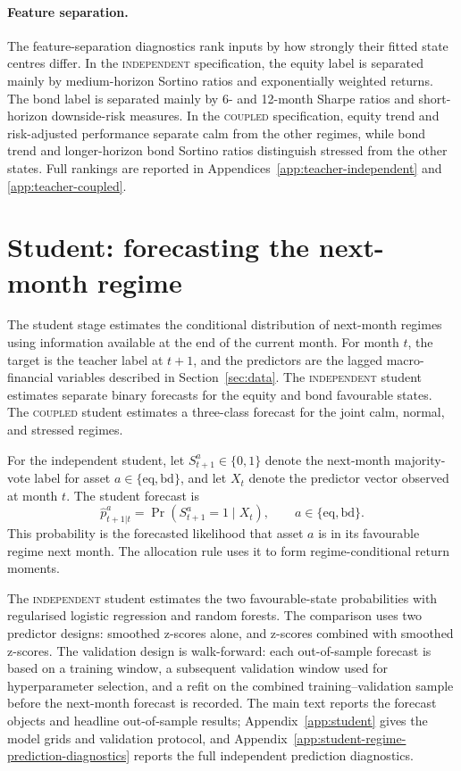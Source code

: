 \documentclass[10pt]{article}
\newcommand{\Acoup}{\textsc{coupled}}
\newcommand{\Bindep}{\textsc{independent}}
\begin{document}
\paragraph{Feature separation.}
The feature-separation diagnostics rank inputs by how strongly their fitted state centres
differ. In the \Bindep{} specification, the equity label is separated mainly by
medium-horizon Sortino ratios and exponentially weighted returns. The bond label is separated
mainly by 6- and 12-month Sharpe ratios and short-horizon downside-risk measures. In the
\Acoup{} specification, equity trend and risk-adjusted performance separate calm from the
other regimes, while bond trend and longer-horizon bond Sortino ratios distinguish stressed
from the other states. Full rankings are reported in Appendices~\ref{app:teacher-independent}
and \ref{app:teacher-coupled}.


\section{Student: forecasting the next-month regime}
\label{sec:student}

The student stage estimates the conditional distribution of next-month regimes using information available at the end of the current month. For month \(t\), the target is the teacher label at \(t+1\), and the predictors are the lagged macro-financial variables described in Section~\ref{sec:data}. The \Bindep{} student estimates separate binary forecasts for the equity and bond favourable states. The \Acoup{} student estimates a three-class forecast for the joint calm, normal, and stressed regimes.

For the independent student, let \(S^a_{t+1}\in\{0,1\}\) denote the next-month majority-vote label for asset \(a\in\{\mathrm{eq},\mathrm{bd}\}\), and let \(X_t\) denote the predictor vector observed at month \(t\). The student forecast is
\begin{equation}
    \hat p^a_{t+1|t}
    =
    \Pr\!\left(S^a_{t+1}=1\mid X_t\right),
    \qquad a\in\{\mathrm{eq},\mathrm{bd}\}.
    \label{eq:independent-student-probability}
\end{equation}
This probability is the forecasted likelihood that asset \(a\) is in its favourable regime next month. The allocation rule uses it to form regime-conditional return moments.

The \Bindep{} student estimates the two favourable-state probabilities with regularised
logistic regression and random forests. The comparison uses two predictor designs: smoothed
z-scores alone, and z-scores combined with smoothed z-scores. The validation design is
walk-forward: each out-of-sample forecast is based on a training window, a subsequent
validation window used for hyperparameter selection, and a refit on the combined
training--validation sample before the next-month forecast is recorded. The main text reports
the forecast objects and headline out-of-sample results; Appendix~\ref{app:student} gives
the model grids and validation protocol, and Appendix~\ref{app:student-regime-prediction-diagnostics}
reports the full independent prediction diagnostics.
\end{document}
